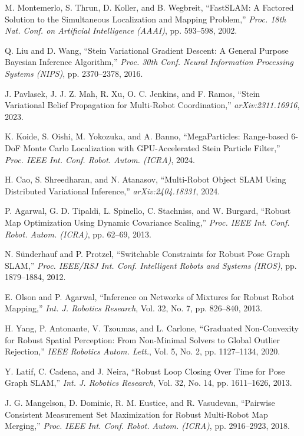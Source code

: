 \begin{thebibliography}{99}
M. Montemerlo, S. Thrun, D. Koller, and B. Wegbreit, ``{FastSLAM}: A Factored Solution to the Simultaneous Localization and Mapping Problem,'' {\it Proc. 18th Nat. Conf. on Artificial Intelligence ({AAAI})}, pp. 593--598, 2002.

Q. Liu and D. Wang, ``Stein Variational Gradient Descent: A General Purpose Bayesian Inference Algorithm,'' {\it Proc. 30th Conf. Neural Information Processing Systems ({NIPS})}, pp. 2370--2378, 2016.

J. Pavlasek, J. J. Z. Mah, R. Xu, O. C. Jenkins, and F. Ramos, ``Stein Variational Belief Propagation for Multi-Robot Coordination,'' {\it arXiv:2311.16916}, 2023.

K. Koide, S. Oishi, M. Yokozuka, and A. Banno, ``MegaParticles: Range-based 6-DoF Monte Carlo Localization with GPU-Accelerated Stein Particle Filter,'' {\it Proc. {IEEE} Int. Conf. Robot. Autom. ({ICRA})}, 2024.

H. Cao, S. Shreedharan, and N. Atanasov, ``Multi-Robot Object {SLAM} Using Distributed Variational Inference,'' {\it arXiv:2404.18331}, 2024.

P. Agarwal, G. D. Tipaldi, L. Spinello, C. Stachniss, and W. Burgard, ``Robust Map Optimization Using Dynamic Covariance Scaling,'' {\it Proc. {IEEE} Int. Conf. Robot. Autom. ({ICRA})}, pp. 62--69, 2013.

N. Sünderhauf and P. Protzel, ``Switchable Constraints for Robust Pose Graph {SLAM},'' {\it Proc. {IEEE/RSJ} Int. Conf. Intelligent Robots and Systems ({IROS})}, pp. 1879--1884, 2012.

E. Olson and P. Agarwal, ``Inference on Networks of Mixtures for Robust Robot Mapping,'' {\it Int. J. Robotics Research}, Vol. 32, No. 7, pp. 826--840, 2013.

H. Yang, P. Antonante, V. Tzoumas, and L. Carlone, ``Graduated Non-Convexity for Robust Spatial Perception: From Non-Minimal Solvers to Global Outlier Rejection,'' {\it {IEEE} Robotics Autom. Lett.}, Vol. 5, No. 2, pp. 1127--1134, 2020.

Y. Latif, C. Cadena, and J. Neira, ``Robust Loop Closing Over Time for Pose Graph {SLAM},'' {\it Int. J. Robotics Research}, Vol. 32, No. 14, pp. 1611--1626, 2013.

J. G. Mangelson, D. Dominic, R. M. Eustice, and R. Vasudevan, ``Pairwise Consistent Measurement Set Maximization for Robust Multi-Robot Map Merging,'' {\it Proc. {IEEE} Int. Conf. Robot. Autom. ({ICRA})}, pp. 2916--2923, 2018.


\end{thebibliography}
